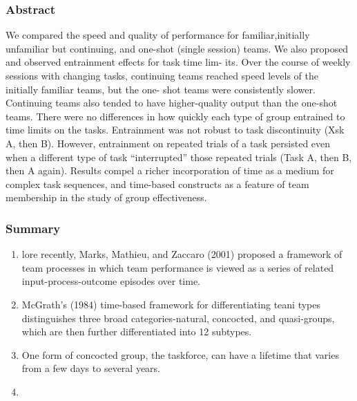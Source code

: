\documentclass[12pt]{article}
\begin{document}
\subsubsection*{Abstract}
We compared the speed and quality of performance for familiar,initially unfamiliar but continuing, and one-shot (single session) teams. We also proposed and observed entrainment effects for task time lim- its. Over the course of weekly sessions with changing tasks, continuing teams reached speed levels of the initially familiar teams, but the one- shot teams were consistently slower. Continuing teams also tended to have higher-quality output than the one-shot teams. There were no differences in how quickly each type of group entrained to time limits on the tasks. Entrainment was not robust to task discontinuity (Xsk A, then B). However, entrainment on repeated trials of a task persisted even when a different type of task “interrupted” those repeated trials (Task A, then B, then A again). Results compel a richer incorporation of time as a medium for complex task sequences, and time-based constructs as a feature of team membership in the study of group effectiveness.

\subsubsection*{Summary}

\begin{enumerate}
    \item lore recently, Marks, Mathieu, and Zaccaro (2001) proposed a framework of team processes in which team performance is viewed as a series of related input-process-outcome episodes over time.
    \item McGrath’s (1984) time-based framework for differentiating teani types distinguishes three broad categories-natural, concocted, and quasi-groups, which are then further differentiated into 12 subtypes.
    \item One form of concocted group, the taskforce, can have a lifetime that varies from a few days to several years.
    \item 
\end{enumerate}
\end{document}

